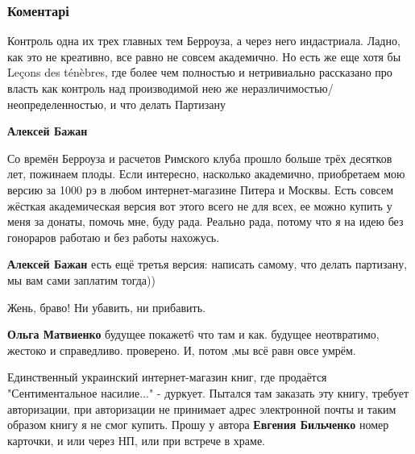  
 
 
 
 
\subsubsection{Коментарі}

\begin{itemize} %

Контроль одна их трех главных тем Берроуза, а через него индастриала. Ладно,
как это не креативно, все равно не совсем академично. Но есть же еще хотя бы
Leçons des ténèbres, где более чем полностью и нетривиально рассказано про
власть как контроль над производимой нею же неразличимостью/неопределенностью,
и что делать Партизану

\begin{itemize} %
\textbf{Алексей Бажан} 

Со времён Берроуза и расчетов Римского клуба прошло больше трёх десятков лет,
пожинаем плоды. Если интересно, насколько академично, приобретаем мою версию за
1000 рэ в любом интернет-магазине Питера и Москвы. Есть совсем жёсткая
академическая версия вот этого всего не для всех, ее можно купить у меня за
донаты, помочь мне, буду рада. Реально рада, потому что я на идею без гонораров
работаю и без работы нахожусь.

\textbf{Алексей Бажан} есть ещё третья версия: написать самому, что делать партизану, мы вам сами заплатим тогда))
\end{itemize} %

Жень, браво! Ни убавить, ни прибавить.

\begin{itemize} %
\textbf{Ольга Матвиенко} будущее покажет6 что там и как. будущее неотвратимо, жестоко и справедливо. проверено. И, потом ,мы всё равн овсе умрём.
\end{itemize} %


Единственный украинский интернет-магазин книг, где продаётся "Сентиментальное
насилие..." - дуркует. Пытался там заказать эту книгу, требует авторизации, при
авторизации не принимает адрес электронной почты и таким образом книгу я не
смог купить. Прошу у автора \textbf{Евгения Бильченко} номер карточки, и или через НП,
или при встрече в храме.


\end{itemize}
